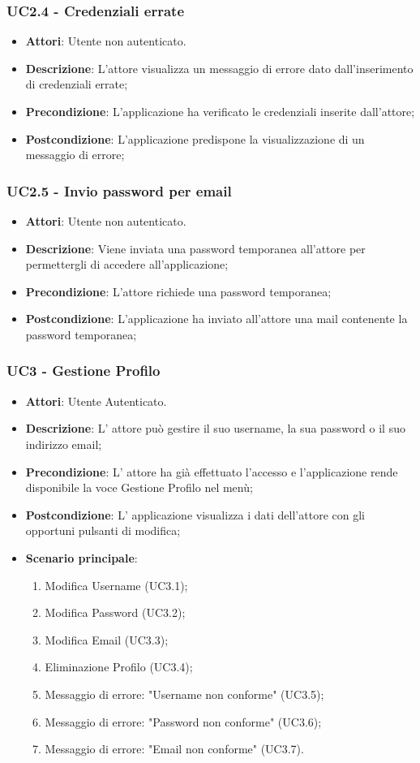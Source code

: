 \subsubsection{UC2.4 - Credenziali errate} 
\label{sssec:UC2.4} 
\begin{itemize} 
\item \textbf{Attori}: Utente non autenticato.
\item \textbf{Descrizione}: L’attore visualizza un messaggio di errore dato dall’inserimento di credenziali errate;
\item \textbf{Precondizione}: L'applicazione ha verificato le credenziali inserite dall’attore;
\item \textbf{Postcondizione}: L'applicazione predispone la visualizzazione di un messaggio di errore;
\end{itemize} 
\subsubsection{UC2.5 - Invio password per email} 
\label{sssec:UC2.5} 
\begin{itemize} 
\item \textbf{Attori}: Utente non autenticato.
\item \textbf{Descrizione}: Viene inviata una password temporanea all'attore per permettergli di accedere all'applicazione;
\item \textbf{Precondizione}: L'attore richiede una password temporanea;
\item \textbf{Postcondizione}: L'applicazione ha inviato all'attore una mail contenente la password temporanea;
\end{itemize} 
\subsubsection{UC3 - Gestione Profilo} 
\label{sssec:UC3} 
\begin{itemize} 
\item \textbf{Attori}: Utente Autenticato.
\item \textbf{Descrizione}: L' attore può gestire il suo username, la sua password o il suo indirizzo email;
\item \textbf{Precondizione}: L' attore ha già effettuato l'accesso e l'applicazione rende disponibile la voce Gestione Profilo nel menù;
\item \textbf{Postcondizione}: L' applicazione visualizza i dati dell'attore con gli opportuni pulsanti di modifica;
\item \textbf{Scenario principale}: \begin{enumerate}\item Modifica Username (UC3.1);\item Modifica Password (UC3.2);\item Modifica Email (UC3.3);\item Eliminazione Profilo (UC3.4);\item Messaggio di errore: "Username non conforme" (UC3.5);\item Messaggio di errore: "Password non conforme" (UC3.6);\item Messaggio di errore: "Email non conforme" (UC3.7). 
 \end{enumerate}
\end{itemize} 
